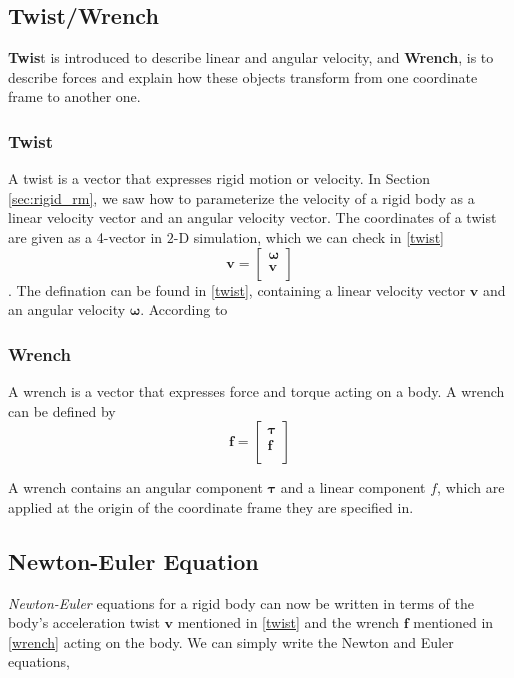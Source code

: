 \subsection{Twist/Wrench}
\textbf{Twis}t is introduced to describe linear and angular velocity, and \textbf{Wrench}, is to describe forces and explain how these objects transform from one coordinate frame to another one. 
    \subsubsection{Twist} 
        A twist is a vector that expresses rigid motion or velocity. In Section \ref{sec:rigid_rm}, we saw how to parameterize the velocity of a rigid body as a linear velocity vector and an angular velocity vector. The coordinates of a twist are given as a 4-vector in $2$-D simulation, which we can check in \ref{twist}
            \begin{equation}
                \mathbf{v} = \left[ \begin{array}{c} \pmb{\omega} \\ \pmb{v} \\ \end{array} \right]
                \label{twist}
            \end{equation}.
        The defination can be found in \ref{twist}, containing a linear velocity vector \(\pmb{v}\) and an angular velocity \(\pmb{\omega}\). According to 

    \subsubsection{Wrench}
        A wrench is a vector that expresses force and torque acting on a body. A wrench can be defined by
        \begin{equation}
            \mathbf{f} = \left[ \begin{array}{c} \pmb{\tau} \\ \pmb{f} \\ \end{array} \right]
            \label{wrench} 
        \end{equation}

        A wrench contains an angular component $\pmb{\tau}$ and a linear component $f$, which are applied at the origin of the coordinate frame they are specified in.


\subsection{Newton-Euler Equation}
    \textit{Newton-Euler} equations for a rigid body can now be written in terms of the body's acceleration twist $\mathbf{v}$ mentioned in \ref{twist} and the wrench $\mathbf{f}$ mentioned in \ref{wrench} acting on the body. We can simply write the Newton and Euler equations,

